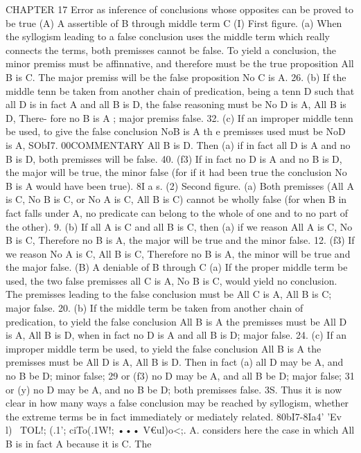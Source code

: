 {{{{{{{{{{{{{CHAPTER 17
Error as inference of conclusions whose opposites can be
proved to be true
(A) A assertible of B through middle term C
(I) First figure. (a) When the syllogism leading to a false
conclusion uses the middle term which really connects the terms,
both premisses cannot be false. To yield a conclusion, the minor
premiss must be affinnative, and therefore must be the true
proposition All B is C. The major premiss will be the false
proposition No C is A.
26. (b) If the middle tenn be taken from another chain of
predication, being a tenn D such that all D is in fact A and all
B is D, the false reasoning must be No D is A, All B is D, There-
fore no B is A ; major premiss false.
32. (c) If an improper middle tenn be used, to give the false
conclusion NoB is A th e premisses used must be NoD is A,
SObI7.
00COMMENTARY
All B is D. Then (a) if in fact all D is A and no B is D, both
premisses will be false.
40. (f3) If in fact no D is A and no B is D, the major will be
true, the minor false (for if it had been true the conclusion No
B is A would have been true).
8I a s. (2) Second figure. (a) Both premisses (All A is C, No
B is C, or No A is C, All B is C) cannot be wholly false (for when
B in fact falls under A, no predicate can belong to the whole
of one and to no part of the other).
9. (b) If all A is C and all B is C, then (a) if we reason All
A is C, No B is C, Therefore no B is A, the major will be true
and the minor false.
12. (f3) If we reason No A is C, All B is C, Therefore no B is
A, the minor will be true and the major false.
(B) A deniable of B through C
(a) If the proper middle term be used, the two false premisses
all C is A, No B is C, would yield no conclusion. The premisses
leading to the false conclusion must be All C is A, All B is C;
major false.
20. (b) If the middle term be taken from another chain of
predication, to yield the false conclusion All B is A the premisses
must be All D is A, All B is D, when in fact no D is A and all
B is D; major false.
24. (c) If an improper middle term be used, to yield the false
conclusion All B is A the premisses must be All D is A, All B is
D. Then in fact (a) all D may be A, and no B be D; minor false;
29 or (f3) no D may be A, and all B be D; major false;
31 or (y) no D may be A, and no B be D; both premisses
false.
3S. Thus it is now clear in how many ways a false conclusion
may be reached by syllogism, whether the extreme terms be
in fact immediately or mediately related.
80bI7-8Ia4' 'Ev l)~ TOL!; (.1'; ciTo(.1W!; ••• V€ul)o<;. A. considers
here the case in which All B is in fact A because it is C. The
}}}}}}}}}}}}}
